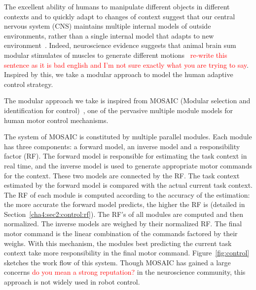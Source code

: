 The excellent ability of humans to manipulate different objects in different contexts and to quickly adapt to changes of context suggest that our central nervous system (CNS) maintains multiple internal models of outside environments, rather than a single internal model that adapts to new environment~\cite{neilson1985acquisition}. Indeed, neuroscience evidence suggests that animal brain sum modular stimulates of muscles to generate different motions~\cite{mussa1994linear}
\textcolor{red}{re-write this sentence as it is bad english and I'm not sure exactly what you are trying to say}.
Inspired by this, we take a modular approach to model the human adaptive control strategy.



The modular approach we take is inspired from MOSAIC (Modular selection and identification for control)~\cite{haruno2001mosaic}, one of the pervasive multiple module models for human motor control mechanisms.

The system of MOSAIC is constituted by multiple parallel modules. Each module has three components: a forward model, an inverse model and a responsibility factor (RF). The forward model is responsible for estimating the task context in real time, and the inverse model is used to generate appropriate motor commands for the context. These two models are connected by the RF. The task context estimated by the forward model is compared with the actual current task context.
The RF of each module is computed according to the accuracy of the estimation: the more accurate the forward model predicts, the higher the RF is (detailed in Section~\ref{cha4:sec2:control:rf}). The RF's of all modules are computed and then normalized.
The inverse models are weighed by their normalized RF. The final motor command is the linear combination of the commands factored by their weighs. With this mechanism, the modules best predicting the current task context take more responsibility in the final motor command. Figure~\ref{fig:control} sketches the work flow of this system. Though MOSAIC has gained a large concerns \textcolor{red}{do you mean a strong reputation?} in the neuroscience community, this approach is not widely used in robot control.


